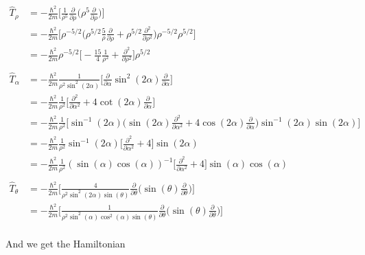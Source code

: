 \documentclass{article}
\begin{document}
\begin{subequations}
\begin{align*}
\hat{T}_{\rho} &= -\frac{\hbar^2}{2m} \Big[ \frac{1}{\rho^5}\frac{\partial}{\partial\rho} \Big( \rho^5 \frac{\partial}{\partial\rho} \Big)  \Big]\\ 
                      &= -\frac{\hbar^2}{2m} \Big[ \rho^{-5/2} \Big( \rho^{5/2} \frac{5}{\rho} \frac{\partial}{\partial\rho} + \rho^{5/2} \frac{\partial^2}{\partial\rho^2} \Big) \rho^{-5/2} \rho^{5/2} \Big]\\
                      &= -\frac{\hbar^2}{2m} \rho^{-5/2} \Big[  -\frac{15}{4} \frac{1}{\rho^2} + \frac{\partial^2}{\partial\rho^2} \Big] \rho^{5/2}\\ \\
\hat{T}_{\alpha} &= -\frac{\hbar^2}{2m}  \frac{1}{\rho^2 \sin^2(2\alpha)}  \Big[ \frac{\partial}{\partial\alpha} \sin^2(2\alpha) \frac{\partial}{\partial\alpha} \Big]\\ 
                      &= -\frac{\hbar^2}{2m} \frac{1}{\rho^2} \Big[ \frac{\partial^2}{\partial\alpha^2} + 4\cot(2\alpha) \frac{\partial}{\partial\alpha} \Big]\\
                      &= -\frac{\hbar^2}{2m} \frac{1}{\rho^2} \Big[ \sin^{-1}(2\alpha) \Big(\sin(2\alpha)\frac{\partial^2}{\partial\alpha^2} + 4\cos(2\alpha) \frac{\partial}{\partial\alpha} \Big) \sin^{-1}(2\alpha) \sin(2\alpha) \Big]\\
                      &= -\frac{\hbar^2}{2m} \frac{1}{\rho^2}\sin^{-1}(2\alpha) \Big[ \frac{\partial^2}{\partial\alpha^2} + 4 \Big] \sin(2\alpha)\\
                      &= -\frac{\hbar^2}{2m} \frac{1}{\rho^2}(\sin(\alpha)\cos(\alpha))^{-1} \Big[ \frac{\partial^2}{\partial\alpha^2} + 4 \Big] \sin(\alpha)\cos(\alpha)\\ \\
\hat{T}_{\theta} &= -\frac{\hbar^2}{2m} \Big[ \frac{4}{\rho^2 \sin^2(2\alpha)\sin(\theta)} \frac{\partial}{\partial\theta} \Big( \sin(\theta) \frac{\partial}{\partial\theta} \Big) \Big]\\ 
                      	&= -\frac{\hbar^2}{2m} \Big[ \frac{1}{\rho^2 \sin^2(\alpha)\cos^2(\alpha)\sin(\theta)} \frac{\partial}{\partial\theta} \Big( \sin(\theta) \frac{\partial}{\partial\theta} \Big) \Big]\\ 
\end{align*}                      		
\end{subequations} 

And we get the Hamiltonian 
\end{document}
